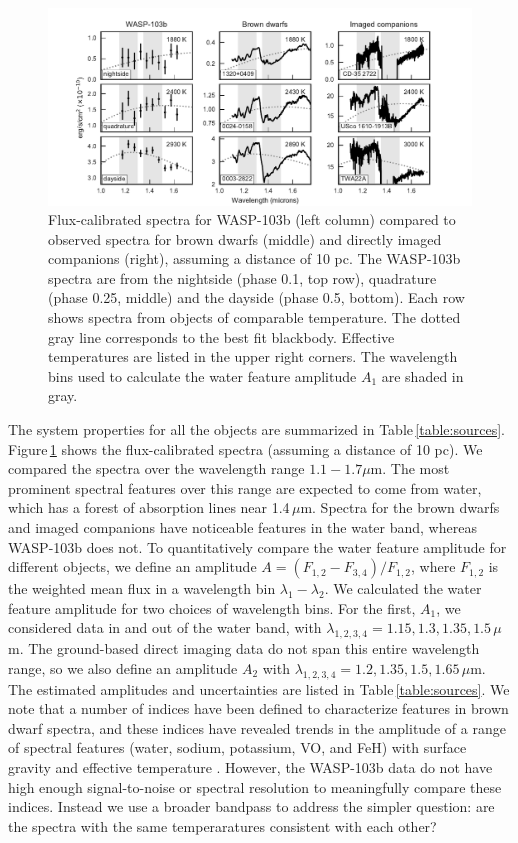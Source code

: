 \documentclass[twocolumn, trackchanges]{aastex61}
\begin{document}
\begin{figure}
\includegraphics[width = 1.0\textwidth]{fig17.pdf}
\caption{Flux-calibrated spectra for WASP-103b (left column) compared to observed spectra for brown dwarfs (middle) and directly imaged companions (right), assuming a distance of 10 pc. The WASP-103b spectra are from the nightside (phase 0.1, top row), quadrature (phase 0.25, middle) and the dayside (phase 0.5, bottom). Each row shows spectra from objects of comparable temperature. The dotted gray line corresponds to the best fit blackbody. Effective temperatures are listed in the upper right corners. The wavelength bins used to calculate the water feature amplitude $A_1$ are shaded in gray.}
\label{fig:planetstarcomparison}
\end{figure}

The system properties for all the objects are summarized in Table\,\ref{table:sources}.  Figure\,\ref{fig:planetstarcomparison} shows the flux-calibrated spectra (assuming a distance of 10 pc).  We compared the spectra over the wavelength range $1.1 - 1.7\mu$m. The most prominent spectral features over this range are expected to come from water, which has a forest of absorption lines near 1.4\,$\mu$m. Spectra for the brown dwarfs and imaged companions have noticeable features in the water band, whereas WASP-103b does not. To quantitatively compare the water feature amplitude for different objects, we define an amplitude $A = (F_{1,2} - F_{3,4})/F_{1,2}$, where $F_{1,2}$ is the weighted mean flux in a wavelength bin $\lambda_1 - \lambda_2$. We calculated the water feature amplitude for two choices of wavelength bins. For the first, $A_1$, we considered data in and out of the water band, with $\lambda_{1,2,3,4} = 1.15, 1.3, 1.35, 1.5\,\mu$m. The ground-based direct imaging data do not span this entire wavelength range, so we also define an amplitude $A_2$ with $\lambda_{1,2,3,4} = 1.2, 1.35, 1.5, 1.65\,\mu$m. The estimated amplitudes and uncertainties are listed in Table\,\ref{table:sources}. We note that a number of indices have been defined to characterize features in brown dwarf spectra, and these indices have revealed trends in the amplitude of a range of spectral features (water, sodium, potassium, VO, and FeH) with surface gravity and effective temperature \citep{reid01,geballe02,mclean03}. However, the WASP-103b data do not have high enough signal-to-noise or spectral resolution to meaningfully compare these indices. Instead we use a broader bandpass to address the simpler question: are the spectra with the same temperaratures consistent with each other?
 
\end{document}
